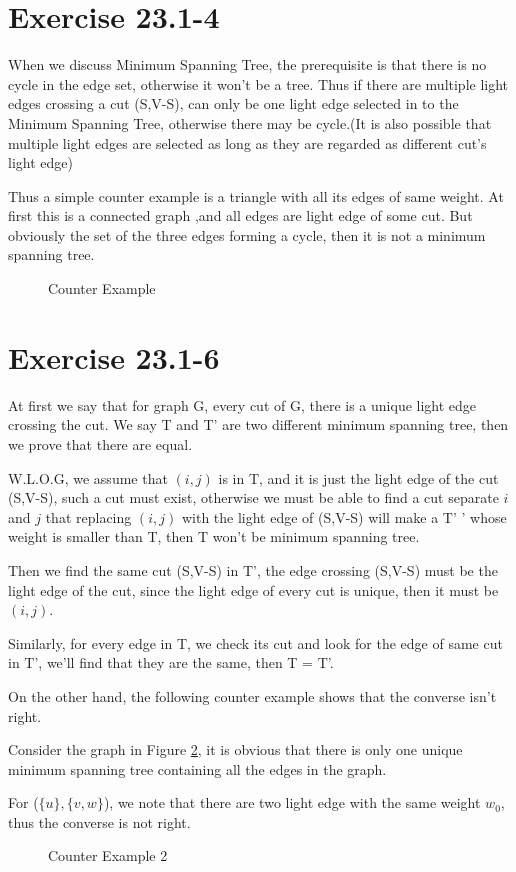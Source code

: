 \documentclass[oneside]{homework} %
\begin{document}
\maketitle
\newpage
\section {Exercise 23.1-4}

When we discuss Minimum Spanning Tree, the prerequisite is that there is no cycle in the edge set, otherwise it won't be a tree. Thus if there are multiple light edges crossing a cut (S,V-S), can only be one light edge selected in to the Minimum Spanning Tree, otherwise there may be cycle.(It is also possible that multiple light edges are selected as long as they are regarded as different cut's light edge)

Thus a simple counter example is a triangle with all its edges of same weight. At first this is a connected graph ,and all edges are light edge of some cut. But obviously the set of the three edges forming a cycle, then it is not a minimum spanning tree.
\begin{figure}[h]
  \centering
  \caption{Counter Example}
  \label{fig:ce1}
\end{figure}


\section {Exercise 23.1-6}
At first we say that for graph G, every cut of G, there is a unique light edge crossing the cut. We say T and T' are two different minimum spanning tree, then we prove that there are equal.

W.L.O.G, we assume that $(\mathit{i},\mathit{j})$ is in T, and it is just the light edge of the cut (S,V-S), such a cut must exist, otherwise we must be able to find a cut separate $\mathit{i}$ and $\mathit{j}$ that replacing  $(\mathit{i},\mathit{j})$ with the light edge of (S,V-S) will make a T' ' whose weight is smaller than T, then T won't be minimum spanning tree.

Then we find the same cut (S,V-S) in T', the edge crossing (S,V-S) must be the light edge of the cut, since the light edge of every cut is unique, then it must be $(\mathit{i},\mathit{j})$.

Similarly, for every edge in T, we check its cut and look for the edge of same cut in T', we'll find that they are the same, then T = T'.

On the other hand, the following counter example shows that the converse isn't right. 

Consider the graph in Figure \ref{fig:ce2}, it is obvious that there is only one unique minimum spanning tree containing all the edges in the graph.  

For ($\{ \mathit{u} \},\{ \mathit{v} ,\mathit{w}\}$), we note that there are two light edge with the same weight $w_{0}$, thus the converse is not right.

\begin{figure}[h]
  \centering
  \caption{Counter Example 2}
  \label{fig:ce2}
\end{figure}
\end{document}
